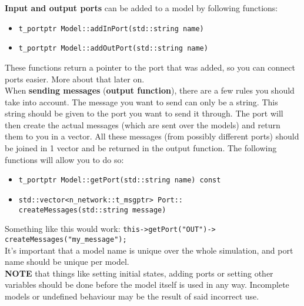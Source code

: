 \textbf{Input and output ports} can be added to a model by following functions:
\begin{itemize}
	\item \texttt{t\_portptr Model::addInPort(std::string name)}
	\item \texttt{t\_portptr Model::addOutPort(std::string name)}
\end{itemize}
These functions return a pointer to the port that was added, so you can connect ports easier. More about that later on. \\

When \textbf{sending messages} (\textbf{output function}), there are a few rules you should take into account. The message you want to send can only be a string. This string should be given to the port you want to send it through. The port will then create the actual messages (which are sent over the models) and return them to you in a vector. All these messages (from possibly different ports) should be joined in 1 vector and be returned in the output function. The following functions will allow you to do so:
\begin{itemize}
	\item \texttt{t\_portptr Model::getPort(std::string name) const}
	\item \texttt{std::vector{\textless}n\_network::t\_msgptr{\textgreater} Port:: \\createMessages(std::string message)}
\end{itemize} 
Something like this would work: \texttt{this-{\textgreater}getPort("OUT")-{\textgreater} \\createMessages("my\_message");} \\

It's important that a model name is unique over the whole simulation, and port name should be unique per model. \\

\textbf{NOTE} that things like setting initial states, adding ports or setting other variables should be done before the model itself is used in any way. Incomplete models or undefined behaviour may be the result of said incorrect use.

